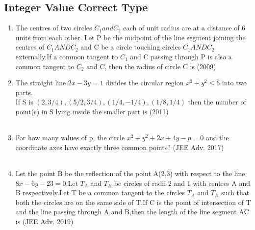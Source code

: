 \documentclass[journal,12pt,twocolumn]{IEEEtran}
\theoremstyle{remark}
\begin{document}
\subsection{Integer Value Correct Type}
\begin{enumerate}
\item The centres of two circles $C_1 and C_2$ each of unit radius are at a distance of 6 units from each other. Let P be the midpoint of the line segment joining the centres of $C_1 AND C_2$ and C be a circle touching circles $C_1 AND C_2$ externally.If a common tangent to $C_1$ and C passing through P is also a common tangent to $C_2$ and C, then the radius of circle C is \hfill{(2009)}\\
\item The straight line $2x-3y=1$ divides the circular region $x^2+y^2\leq6$ into two parts.\\
If S is {$(2,3/4),(5/2,3/4),(1/4,-1/4),(1/8,1/4)$} then the  number of point(s) in S lying inside the smaller part is \hfill{(2011)}\\
\\
\item For how many values of p, the circle $x^2+y^2+2x+4y-p=0$ and the coordinate axes have exactly three common points? \hfill{(JEE Adv. 2017)}\\
\\
\item Let the point B be the reflection of the point A(2,3) with respect to the line $8x-6y-23=0$.Let $T_A$ and $T_B$ be circles of radii $2$ and $1$ with centres A and B respectively.Let T be a common tangent to the circles $T_A$ and $T_B$ such that both the circles are on the same side of T.If C is the point of intersection of T and the line passing through A and B,then the length of the line segment AC is \hfill{(JEE Adv. 2019)}
\end{enumerate}
\end{document}

